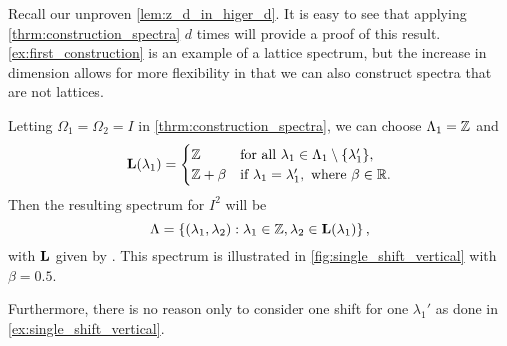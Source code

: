 \documentclass[../thesis.tex]{subfiles}
\begin{document}
Recall our unproven \cref{lem:z_d_in_higer_d}. It is easy to see that applying \cref{thrm:construction_spectra} $d$ times will provide a proof of this result. \cref{ex:first_construction} is an example of a lattice spectrum, but the increase in dimension allows for more flexibility in that we can also construct spectra that are not lattices. %



\begin{example}\label{ex:single_shift_vertical}
    Letting $\Omega_1=\Omega_2 = I$ in \cref{thrm:construction_spectra}, we can choose $\Lambda_1 = \mathbb{Z}$ and 
    \begin{align}\label{eq:single_shift_vertical}
        \mathbf{L}(\lambda_1) = \begin{cases}        
            \mathbb{Z} & \text{for all } \lambda_1 \in \Lambda_1\setminus\{\lambda_1'\},\\        
            \mathbb{Z}+\beta & \text{if } \lambda_1=\lambda_1',\text{ where } \beta \in \mathbb{R}.   
        \end{cases}
    \end{align}
    Then the resulting spectrum for $I^2$ will be
    \begin{equation}\label{eq:lam_single_shift_vertical}
        \Lambda = \left\{(\lambda_1, \lambda_2): \lambda_1\in \mathbb{Z}, \lambda_2 \in \mathbf{L}(\lambda_1)\right\},
    \end{equation}
    with $\mathbf{L}$ given by . This spectrum is illustrated in \cref{fig:single_shift_vertical} with $\beta = 0.5$.
\end{example} %
Furthermore, there is no reason only to consider one shift for one $\lambda_1'$ as done in \cref{ex:single_shift_vertical}. 
\end{document}
